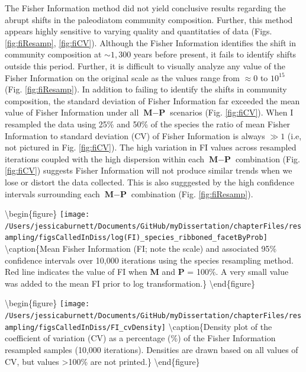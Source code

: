 \documentclass[12pt,twoside,openany]{reedthesis}
\begin{document}
The Fisher Information method did not yield conclusive results regarding the abrupt shifts in the paleodiatom community composition. Further, this method appears highly sensitive to varying quality and quantitaties of data (Figs. \ref{fig:fiResamp}, \ref{fig:fiCV}). Although the Fisher Information identifies the shift in community composition at \(\sim1,300\) years before present, it fails to identify shifts outside this period. Further, it is difficult to visually analyze any value of the Fisher Information on the original scale as the values range from \(\approx 0\) to \(10^15\) (Fig. \ref{fig:fiResamp}). In addition to failing to identify the shifts in community composition, the standard deviation of Fisher Information far exceeded the mean value of Fisher Information under all \(\textbf{M}-\textbf{P}\) scenarios (Fig. \ref{fig:fiCV}). When I resampled the data using 25\% and 50\% of the species the ratio of mean Fisher Information to standard deviation (CV) of Fisher Information is always \(\gg 1\) (i.e, not pictured in Fig. \ref{fig:fiCV}). The high variation in FI values across resampled iterations coupled with the high dispersion within each \(\textbf{M}-\textbf{P}\) combination (Fig. \ref{fig:fiCV}) suggests Fisher Information will not produce similar trends when we lose or distort the data collected. This is also sugggested by the high confidence intervals surrounding each \(\textbf{M}-\textbf{P}\) combination (Fig. \ref{fig:fiResamp}).

\textbackslash begin\{figure\}
\texttt{[image: /Users/jessicaburnett/Documents/GitHub/myDissertation/chapterFiles/resampling/figsCalledInDiss/log(FI)\_species\_ribboned\_facetByProb]} \textbackslash caption\{Mean Fisher Information (FI; note the scale) and associated 95\% confidence intervals over 10,000 iterations using the species resampling method. Red line indicates the value of FI when \textbf{M} and \textbf{P} = 100\%. A very small value was added to the mean FI prior to log transformation.\}\label{fig:fiResamp}
\textbackslash end\{figure\}

\textbackslash begin\{figure\}
\texttt{[image: /Users/jessicaburnett/Documents/GitHub/myDissertation/chapterFiles/resampling/figsCalledInDiss/FI\_cvDensity]} \textbackslash caption\{Density plot of the coefficient of variation (CV) as a percentage (\%) of the Fisher Information resampled samples (10,000 iterations). Densities are drawn based on all values of CV, but values \textgreater100\% are not printed.\}\label{fig:fiCV}
\textbackslash end\{figure\}
\end{document}
